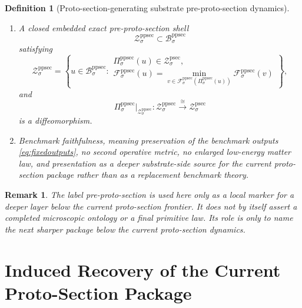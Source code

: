 \documentclass[11pt]{article}
\newcommand{\ProtoSectionBody}[1]{\mathcal B_{#1}^{\mathrm{psec}}}
\newcommand{\ProtoSectionFunctional}[1]{\mathscr E_{#1}^{\mathrm{psec}}}
\newcommand{\ProtoSectionShell}[1]{\mathcal Z_{#1}^{\mathrm{psec}}}
\newcommand{\PreProtoSectionBody}[1]{\mathcal B_{#1}^{\mathrm{ppsec}}}
\newcommand{\PreProtoSectionProj}[1]{\Pi_{#1}^{\mathrm{ppsec}}}
\newcommand{\PreProtoSectionFiber}[2]{\mathcal F_{#1}^{\mathrm{ppsec}}(#2)}
\newcommand{\PreProtoSectionProtoMin}[1]{\mathfrak n_{#1}^{\mathrm{ppsec}}}
\newcommand{\PreProtoSectionFunctional}[1]{\mathscr F_{#1}^{\mathrm{ppsec}}}
\newcommand{\PreProtoSectionShell}[1]{\mathcal Z_{#1}^{\mathrm{ppsec}}}
\newtheorem{definition}{Definition}
\newtheorem{remark}{Remark}
\begin{document}
\begin{definition}[Proto-section-generating substrate pre-proto-section dynamics]
\begin{enumerate}
\[    =
    \mathrm{id}_{\ProtoSectionBody{\sigma}},
    \]
    and the effective minimum value recovers the recorded proto-section functional on the benchmark-relevant body:
    \[
    \ProtoSectionFunctional{\sigma}(y)
    =
    \PreProtoSectionFunctional{\sigma}\bigl(\PreProtoSectionProtoMin{\sigma}(y)\bigr)
    =
    \min_{u\in\PreProtoSectionFiber{\sigma}{y}}
    \PreProtoSectionFunctional{\sigma}(u)
    \qquad
    \text{for every }
    y\in\ProtoSectionBody{\sigma}.
    \]
    \item A closed embedded exact pre-proto-section shell
    \[
    \PreProtoSectionShell{\sigma}\subset\PreProtoSectionBody{\sigma}
    \]
    satisfying
    \[
    \PreProtoSectionShell{\sigma}
    =
    \left\{
    u\in\PreProtoSectionBody{\sigma}:
    \begin{array}{l}
    \PreProtoSectionProj{\sigma}(u)\in\ProtoSectionShell{\sigma},\\[0.2em]
    \PreProtoSectionFunctional{\sigma}(u)
    =
    \displaystyle\min_{v\in\PreProtoSectionFiber{\sigma}{\PreProtoSectionProj{\sigma}(u)}}
    \PreProtoSectionFunctional{\sigma}(v)
    \end{array}
    \right\},
    \]
    and
    \[
    \PreProtoSectionProj{\sigma}\big|_{\PreProtoSectionShell{\sigma}}
    :
    \PreProtoSectionShell{\sigma}
    \xrightarrow{\cong}
    \ProtoSectionShell{\sigma}
    \]
    is a diffeomorphism.
    \item Benchmark faithfulness, meaning preservation of the benchmark outputs \eqref{eq:fixedoutputs}, no second operative metric, no enlarged low-energy matter law, and presentation as a deeper substrate-side source for the current proto-section package rather than as a replacement benchmark theory.
\end{enumerate}
\end{definition}

\begin{remark}
The label \emph{pre-proto-section} is used here only as a local marker for a deeper layer below the current proto-section frontier. It does not by itself assert a completed microscopic ontology or a final primitive law. Its role is only to name the next sharper package below the current proto-section dynamics.
\end{remark}

\section{Induced Recovery of the Current Proto-Section Package}
\end{document}
